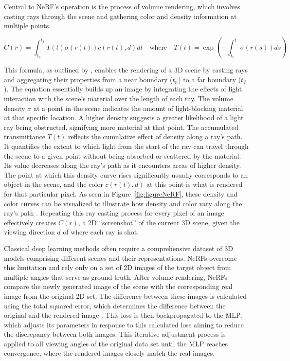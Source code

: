 Central to NeRF's operation is the process of volume rendering, which involves casting rays through the scene and gathering color and density information at multiple points.

\[ 
C(r) = \int_{t_n}^{t_f} T(t)\sigma(r(t))c(r(t), d)dt \quad \text{where} \quad T(t) = \exp\left(-\int_{t_n}^t \sigma(r(s))ds\right) 
\]

This formula, as outlined by \citeauthor{mildenhallNERF}, enables the rendering of a 3D scene by casting rays and aggregating their properties from a near boundary (\(t_n\)) to a far boundary (\(t_f\)). The equation essentially builds up an image by integrating the effects of light interaction with the scene's material over the length of each ray. The volume density \(\sigma\) at a point in the scene indicates the amount of light-blocking material at that specific location. A higher density suggests a greater likelihood of a light ray being obstructed, signifying more material at that point. The accumulated transmittance \( T(t) \) reflects the cumulative effect of density along a ray's path. It quantifies the extent to which light from the start of the ray can travel through the scene to a given point without being absorbed or scattered by the material. Its value decreases along the ray's path as it encounters areas of higher density. The point at which this density curve rises significantly usually corresponds to an object in the scene, and the color \( c(r(t), d) \) at this point is what is rendered for that particular pixel. As seen in Figure~\ref{fig:figureNeRF}, these density and color curves can be visualized to illustrate how density and color vary along the ray's path \citep{mildenhallNERF}. Repeating this ray casting process for every pixel of an image effectively creates \(C(r)\), a 2D ``screenshot'' of the current 3D scene, given the viewing direction \( d \) of where each ray is shot. 

Classical deep learning methods often require a comprehensive dataset of 3D models comprising different scenes and their representations. NeRFs overcome this limitation and rely only on a set of 2D images of the target object from multiple angles that serve as ground truth. After volume rendering, NeRFs compare the newly generated image of the scene with the corresponding real image from the original 2D set. The difference between these images is calculated using the total squared error, which determines the difference between the original and the rendered image \citep{mildenhallNERF}. This loss is then backpropagated to the MLP, which adjusts its parameters in response to this calculated loss aiming to reduce the discrepancy between both images. This iterative adjustment process is applied to all viewing angles of the original data set until the MLP reaches convergence, where the rendered images closely match the real images.

